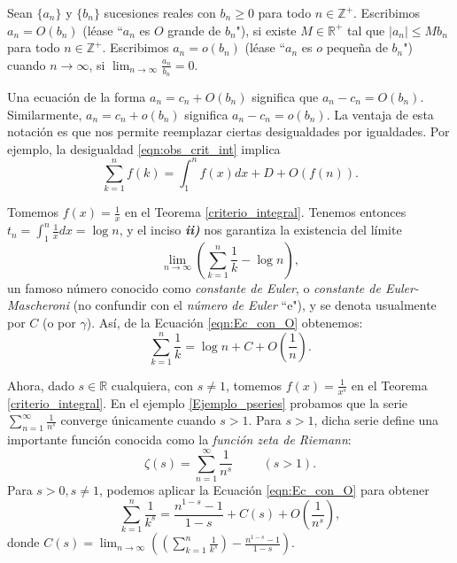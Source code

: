 \begin{definition}
  Sean $\lbrace{a_n\rbrace}$ y $\lbrace{b_n\rbrace}$ sucesiones reales con $b_n\geq 0$ para todo $n\in\mathbb{Z}^+$. Escribimos $a_n=O(b_n)$ (léase ``$a_n$ es $O$ grande de $b_n$"), si existe $M\in\mathbb{R}^+$ tal que $|a_n|\leq Mb_n$ para todo $n\in\mathbb{Z}^+$. Escribimos $a_n=o(b_n)$ (léase ``$a_n$ es $o$ pequeña de $b_n$") cuando $n\to\infty$, si $\lim_{n\to\infty}\frac{a_n}{b_n}=0$.
\end{definition}
\begin{remark}
  Una ecuación de la forma $a_n=c_n+O(b_n)$ significa que $a_n-c_n=O(b_n)$. Similarmente, $a_n=c_n+o(b_n)$ significa $a_n-c_n=o(b_n)$. La ventaja de esta notación es que nos permite reemplazar ciertas desigualdades por igualdades. Por ejemplo, la desigualdad \ref{eqn:obs_crit_int} implica
  \begin{equation}
  \label{eqn:Ec_con_O}  
    \sum_{k=1}^{n}f(k)=\int_1^{n}f(x)dx+D+O(f(n)).
  \end{equation}
\end{remark}
\begin{example}
  Tomemos $f(x)=\frac{1}{x}$ en el Teorema \ref{criterio_integral}. Tenemos entonces $t_n=\int_{1}^{n}\frac{1}{x}dx=\log n$, y el inciso \textit{\textbf{ii)}} nos garantiza la existencia del límite
  \begin{equation*} 
    \lim_{n\to\infty}\left(\sum_{k=1}^n\frac{1}{k}-\log n\right),
  \end{equation*} 
  un famoso número conocido como \textit{constante de Euler}, o \textit{constante de Euler-Mascheroni} (no confundir con el \textit{número de Euler} ``e"), y se denota usualmente por $C$ (o por $\gamma$). Así, de la Ecuación \ref{eqn:Ec_con_O} obtenemos:
  \begin{equation*}
    \sum_{k=1}^{n}\frac{1}{k}=\log n+C+O\left(\frac{1}{n}\right).
  \end{equation*}
\end{example}
\begin{example}
  Ahora, dado $s\in\mathbb{R}$ cualquiera, con $s\neq 1$, tomemos $f(x)=\frac{1}{x^s}$ en el Teorema \ref{criterio_integral}. En el ejemplo \ref{Ejemplo_pseries} probamos que la serie $\sum_{n=1}^{\infty}\frac{1}{n^s}$ converge únicamente cuando $s>1$. Para $s>1$, dicha serie define una importante función conocida como la \textit{función zeta de Riemann}:
  \begin{equation*}
    \zeta(s)=\sum_{n=1}^{\infty}\frac{1}{n^s}\hspace{1cm}(s>1).
  \end{equation*}
  Para $s>0, s\neq 1$, podemos aplicar la Ecuación \ref{eqn:Ec_con_O} para obtener
  \begin{equation*}
    \sum_{k=1}^{n}\frac{1}{k^s}=\frac{n^{1-s}-1}{1-s}+C(s)+O\left(\frac{1}{n^s}\right),
  \end{equation*}
  donde $C(s)=\lim_{n\to\infty}\left(\left(\sum_{k=1}^{n}\frac{1}{k^s}\right)-\frac{n^{1-s}-1}{1-s}\right)$.
\end{example}
